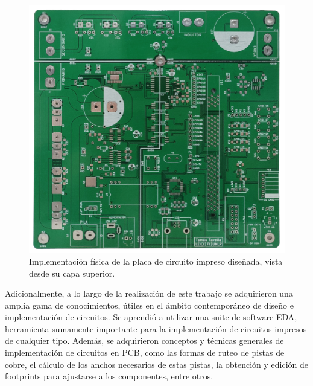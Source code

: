 \begin{figure}[h]
    \centering
    \includegraphics[scale=0.12]{Imagenes/Placa Fisica.jpg}
    \caption{Implementación física de la placa de circuito impreso diseñada, vista desde su capa superior.}
    \label{fig:placa_fisica}
\end{figure}

Adicionalmente, a lo largo de la realización de este trabajo se adquirieron una amplia gama de conocimientos, útiles en el ámbito contemporáneo de diseño e implementación de circuitos. Se aprendió a utilizar una suite de software EDA, herramienta sumamente importante para la implementación de circuitos impresos de cualquier tipo. Además, se adquirieron conceptos y técnicas generales de implementación de circuitos en PCB, como las formas de ruteo de pistas de cobre, el cálculo de los anchos necesarios de estas pistas, la obtención y edición de footprints para ajustarse a los componentes, entre otros.\\